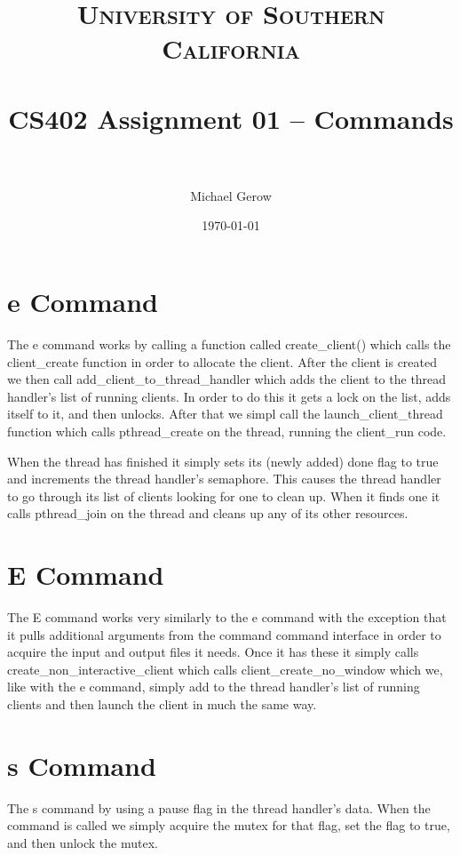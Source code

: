 \documentclass[paper=a4, fontsize=11pt]{scrartcl} %
\title{	
\normalfont \normalsize 
\textsc{University of Southern California} \\ [25pt] %
\horrule{0.5pt} \\[0.4cm] %
\huge CS402 Assignment 01 -- Commands \\ %
\horrule{2pt} \\[0.5cm] %
}
\author{Michael Gerow} %
\date{\normalsize\today} %
\numberwithin{equation}{section} %
\numberwithin{figure}{section} %
\numberwithin{table}{section} %
\begin{document}
\maketitle %


\section{e Command}

The e command works by calling a function called create\_client() which calls the client\_create function in order to allocate the client.  After the client is created we then call add\_client\_to\_thread\_handler which adds the client to the thread handler's list of running clients.  In order to do this it gets a lock on the list, adds itself to it, and then unlocks.  After that we simpl call the launch\_client\_thread function which calls pthread\_create on the thread, running the client\_run code.

When the thread has finished it simply sets its (newly added) done flag to true and increments the thread handler's semaphore. This causes the thread handler to go through its list of clients looking for one to clean up. When it finds one it calls pthread\_join on the thread and cleans up any of its other resources.

\section{E Command}

The E command works very similarly to the e command with the exception that it pulls additional arguments from the command command interface in order to acquire the input and output files it needs. Once it has these it simply calls create\_non\_interactive\_client which calls client\_create\_no\_window which we, like with the e command, simply add to the thread handler's list of running clients and then launch the client in much the same way.

\section{s Command}

The s command by using a pause flag in the thread handler's data. When the command is called we simply acquire the mutex for that flag, set the flag to true, and then unlock the mutex.
\end{document}

